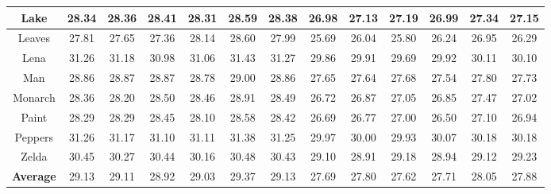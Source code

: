 \begin{table}[t!]
\begin{adjustwidth}{-0.2cm}{}
\begin{center}
\begin{tabular}{|c||c|c|c|c|c|c||c|c|c|c|c|c|}
\\
\hline
 Lake   & 28.34 & 28.36  & 28.41   & 28.31   &  28.59 &28.38    & 26.98  & 27.13 &27.19  & 26.99 &27.34 & 27.15  
\\
\hline
 Leaves & 27.81 & 27.65& 27.36 & 28.14 & 28.60 &27.99     & 25.69 & 26.04 & 25.80 &26.24 & 26.95 & 26.29  
\\
\hline
 Lena& 31.26 & 31.18  & 30.98 &  31.06& 31.43 &31.27     & 29.86& 29.91 & 29.69& 29.92 & 30.11 &30.10   
\\
\hline
 Man& 28.86 & 28.87 & 28.87 & 28.78 & 29.00 & 28.86    & 27.65  & 27.64 & 27.68& 27.54 &27.80 & 27.73     
\\
\hline
 Monarch& 28.36 & 28.20 & 28.50 & 28.46 & 28.91 &28.49    &   26.72  & 26.87 &27.05  & 26.85 & 27.47 &27.02    
\\
\hline
 Paint & 28.29 & 28.29 & 28.45  &  28.10  & 28.58 &28.42    &  26.69 &  26.77 & 27.00  & 26.50 & 27.10 & 26.94 
\\
\hline
 Peppers & 31.26 & 31.17 & 31.10 & 31.11  & 31.38 & 31.25   &   29.97  & 30.00&  29.93 &  30.07 & 30.18 & 30.18    
\\
\hline
 Zelda & 30.45 & 30.27  & 30.44  &  30.16  & 30.48 &30.43    & 29.10&28.91 &29.18  & 28.94 & 29.12 &29.23   
\\
\hline
 \textbf{Average} &  29.13 & 29.11  &  28.92 & 29.03  & 29.37 & 29.13   &27.69&27.80 & 27.62& 27.71&28.05 &27.88     
\\
\hline
\end{tabular}
\end{center}
\end{adjustwidth}
\end{table}

